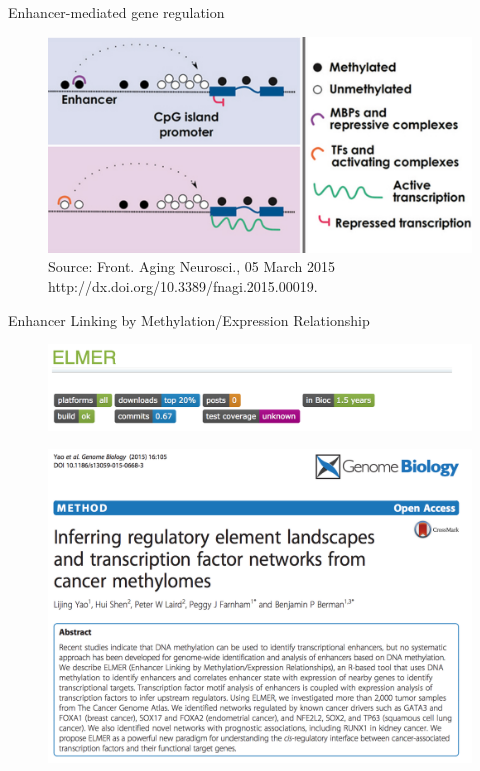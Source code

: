 \documentclass[slidestop,compress,11pt,xcolor=dvipsnames]{beamer}
\begin{document}
\begin{frame}{Enhancer-mediated gene regulation}
 \vspace*{-0.1cm}
 \begin{figure}
  \centering
  \includegraphics[width=1.0\linewidth]{ELMER/dna_met.png}{\tiny{\\Source: Front. Aging Neurosci., 05 March 2015 http://dx.doi.org/10.3389/fnagi.2015.00019.}}
 \end{figure}
\end{frame}

\begin{frame}{ Enhancer Linking by Methylation/Expression Relationship}
 \vspace*{-0.5cm}
 \begin{figure}
  \centering
  \includegraphics[width=0.8\linewidth]{ELMER/elmer1.png}
 \end{figure}
 \vspace*{-0.5cm}
 \begin{figure}
  \centering
  \includegraphics[width=0.8\linewidth]{ELMER/elmer2.png}
 \end{figure}
\end{frame}
\end{document}
